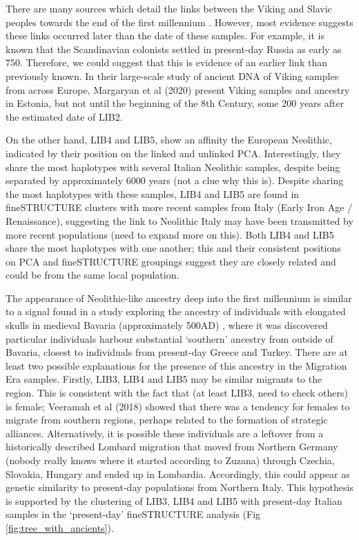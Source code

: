 There are many sources which detail the links between the Viking and Slavic peoples towards the end of the first millennium \cite{duczko2004viking, peterson2016vikings}. However, most evidence suggests these links occurred later than the date of these samples. For example, it is known that the Scandinavian colonists settled in present-day Russia as early as 750. Therefore, we could suggest that this is evidence of an earlier link than previously known. In their large-scale study of ancient DNA of Viking samples from across Europe, Margaryan et al (2020) present Viking samples and ancestry in Estonia, but not until the beginning of the 8th Century, some 200 years after the estimated date of LIB2.  

On the other hand, LIB4 and LIB5, show an affinity the European Neolithic, indicated by their position on the linked and unlinked PCA. Interestingly, they share the most haplotypes with several Italian Neolithic samples, despite being separated by approximately 6000 years (not a clue why this is). Despite sharing the most haplotypes with these samples, LIB4 and LIB5 are found in fineSTRUCTURE clusters with more recent samples from Italy (Early Iron Age / Renaissance), suggesting the link to Neolithic Italy may have been transmitted by more recent populations (need to expand more on this). Both LIB4 and LIB5 share the most haplotypes with one another; this and their consistent positions on PCA and fineSTRUCTURE groupings suggest they are closely related and could be from the same local population. 

The appearance of Neolithic-like ancestry deep into the first millennium is similar to a signal found in a study exploring the ancestry of individuals with elongated skulls in medieval Bavaria (approximately 500AD) \cite{Veeramah2018}, where it was discovered particular individuals harbour substantial `southern' ancestry from outside of Bavaria, closest to individuals from present-day Greece and Turkey. There are at least two possible explanations for the presence of this ancestry in the Migration Era samples. Firstly, LIB3, LIB4 and LIB5 may be similar migrants to the region. This is consistent with the fact that (at least LIB3, need to check others) is female; Veeramah et al (2018) showed that there was a tendency for females to migrate from southern regions, perhaps related to the formation of strategic alliances. Alternatively, it is possible these individuals are a leftover from a historically described Lombard migration that moved from Northern Germany (nobody really knows where it started according to Zuzana) through Czechia, Slovakia, Hungary and ended up in Lombardia. Accordingly, this could appear as genetic similarity to present-day populations from Northern Italy. This hypothesis is supported by the clustering of LIB3, LIB4 and LIB5 with present-day Italian samples in the `present-day' fineSTRUCTURE analysis (Fig \ref{fig:tree_with_ancients}).

